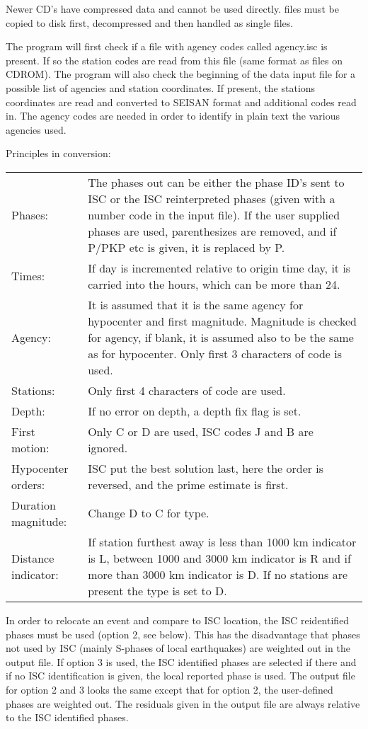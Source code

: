 Newer CD's have compressed data and cannot be used directly. files must be copied to disk first, decompressed and then handled as single files.  

The program will first check if a file with agency codes called agency.isc is present. If so the station codes are read from this file (same format as files on CDROM). The program will also check the beginning of the data input file for a possible list of agencies and station coordinates. If present, the stations coordinates are read and converted to SEISAN format and additional codes read in. The agency codes are needed in order to identify in plain text the various agencies used. 

Principles in conversion: 

\begin{tabular}{lp{10cm}}
Phases: & The phases out can be either the phase ID's sent to ISC or the ISC reinterpreted phases 
(given with a number code in the input file). If the user supplied phases are used, 
parenthesizes are removed, and if P/PKP etc is given, it is replaced by P. \\
Times: & If day is incremented relative to origin time day, it is carried into the hours, which can be 
more than 24. \\
Agency: & It is assumed that it is the same agency for hypocenter and first magnitude. Magnitude is    
checked for agency, if blank, it is assumed also to be the same as for hypocenter. Only first 
3 characters of code is used. \\
Stations: & Only first 4 characters of code are used. \index{Station, only 4 characters} \\
Depth: & If no error on depth, a depth fix flag is set. \\
First motion: & Only C or D are used, ISC codes J and B are ignored. \\
Hypocenter orders: & ISC put the best solution last, here the order is reversed, and the prime estimate 
is  first. \\
Duration magnitude: & Change D to C for type. \\
Distance indicator: & If station furthest away is less than 1000 km indicator is L, between 1000 and 
3000 km indicator is R and if more than 3000 km indicator is D. 
If no stations are present  the type is set to D. 
\end{tabular}

In order to relocate an event and compare to ISC location, the ISC reidentified phases must be used (option 2, see below). This has the disadvantage that phases not used by ISC (mainly S-phases of local earthquakes) are weighted out in the output file. If option 3 is used, the ISC identified phases are selected if there and if no ISC identification is given, the local reported phase is used. The output file for option 2 and 3 looks the same except that for option 2, the user-defined phases are weighted out. The residuals given in the output file are always relative to the ISC identified phases. 

